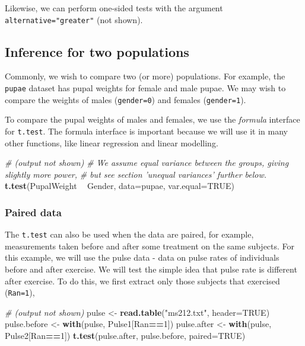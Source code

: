 \documentclass[]{book}
\newenvironment{Shaded}{\begin{snugshade}}{\end{snugshade}}
\newcommand{\CommentTok}[1]{\textcolor[rgb]{0.56,0.35,0.01}{\textit{#1}}}
\newcommand{\DataTypeTok}[1]{\textcolor[rgb]{0.13,0.29,0.53}{#1}}
\newcommand{\DecValTok}[1]{\textcolor[rgb]{0.00,0.00,0.81}{#1}}
\newcommand{\KeywordTok}[1]{\textcolor[rgb]{0.13,0.29,0.53}{\textbf{#1}}}
\newcommand{\NormalTok}[1]{#1}
\newcommand{\OperatorTok}[1]{\textcolor[rgb]{0.81,0.36,0.00}{\textbf{#1}}}
\newcommand{\OtherTok}[1]{\textcolor[rgb]{0.56,0.35,0.01}{#1}}
\newcommand{\StringTok}[1]{\textcolor[rgb]{0.31,0.60,0.02}{#1}}
\begin{document}
Likewise, we can perform one-sided tests with the argument \texttt{alternative="greater"} (not shown).

\hypertarget{inference-for-two-populations}{%
\subsection{Inference for two populations}\label{inference-for-two-populations}}

Commonly, we wish to compare two (or more) populations. For example, the \texttt{pupae} dataset has pupal weights for female and male pupae. We may wish to compare the weights of males (\texttt{gender=0}) and females (\texttt{gender=1}).

To compare the pupal weights of males and females, we use the \emph{formula} interface for \texttt{t.test}. The formula interface is important because we will use it in many other functions, like linear regression and linear modelling.

\begin{Shaded}
\begin{Highlighting}[]
\CommentTok{# (output not shown)}
\CommentTok{# We assume equal variance between the groups, giving slightly more power,}
\CommentTok{# but see section 'unequal variances' further below.}
\KeywordTok{t.test}\NormalTok{(PupalWeight }\OperatorTok{~}\StringTok{ }\NormalTok{Gender, }\DataTypeTok{data=}\NormalTok{pupae, }\DataTypeTok{var.equal=}\OtherTok{TRUE}\NormalTok{)}
\end{Highlighting}
\end{Shaded}

\hypertarget{paired-data}{%
\subsubsection{Paired data}\label{paired-data}}

The \texttt{t.test} can also be used when the data are paired, for example, measurements taken before and after some treatment on the same subjects. For this example, we will use the pulse data - data on pulse rates of individuals before and after exercise. We will test the simple idea that pulse rate is different after exercise. To do this, we first extract only those subjects that exercised (\texttt{Ran=1}),

\begin{Shaded}
\begin{Highlighting}[]
\CommentTok{# (output not shown)}
\NormalTok{pulse <-}\StringTok{ }\KeywordTok{read.table}\NormalTok{(}\StringTok{"ms212.txt"}\NormalTok{, }\DataTypeTok{header=}\OtherTok{TRUE}\NormalTok{)}
\NormalTok{pulse.before <-}\StringTok{ }\KeywordTok{with}\NormalTok{(pulse, Pulse1[Ran}\OperatorTok{==}\DecValTok{1}\NormalTok{])}
\NormalTok{pulse.after <-}\StringTok{ }\KeywordTok{with}\NormalTok{(pulse, Pulse2[Ran}\OperatorTok{==}\DecValTok{1}\NormalTok{])}
\KeywordTok{t.test}\NormalTok{(pulse.after, pulse.before, }\DataTypeTok{paired=}\OtherTok{TRUE}\NormalTok{)}
\end{Highlighting}
\end{Shaded}
\end{document}
